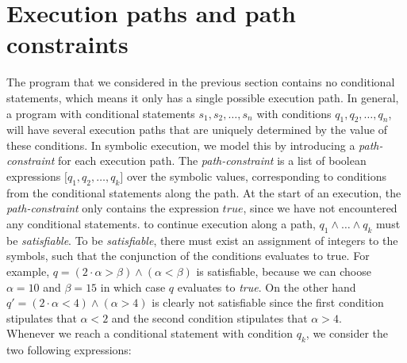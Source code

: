 \section{Execution paths and path constraints}
		The program that we considered in the previous section contains no conditional statements, which means it only has a single possible execution path. In general, a program with conditional statements $s_1, s_2, \ldots, s_n$ with conditions $q_1, q_2, \ldots, q_n$, will have several execution paths that are uniquely determined by the value of these conditions. In symbolic execution, we model this by introducing a \emph{path-constraint} for each execution path. The \emph{path-constraint} is a list of boolean expressions $\lbrack q_1, q_2, \ldots, q_k \rbrack$ over the symbolic values, corresponding to conditions from the conditional statements along the path. At the start of an execution, the \emph{path-constraint} only contains the expression $true$, since we have not encountered any conditional statements. to continue execution along a path, $q_1 \land \ldots \land q_k$ must be \emph{satisfiable}. To be \emph{satisfiable}, there must exist an assignment of integers to the symbols, such that the conjunction of the conditions evaluates to true. For example, $q = (2\cdot \alpha > \beta) \land (\alpha < \beta)$ is satisfiable, because we can choose $\alpha = 10$ and $\beta = 15$ in which case $q$ evaluates to \emph{true}. On the other hand $q' = (2 \cdot \alpha < 4) \land (\alpha > 4)$ is clearly not satisfiable since the first condition stipulates that $\alpha < 2$ and the second condition stipulates that $\alpha > 4$.
		\\
		
		\iffalse
		 This situation can for example occur if we are executing two consecutive \textsl{if}-statements, where the first one has condition $2\cdot \alpha < 4$ and the second has condition $\alpha > 4$. 
		\fi
	
		\noindent Whenever we reach a conditional statement with condition $q_k$, we consider the two following expressions:
	
